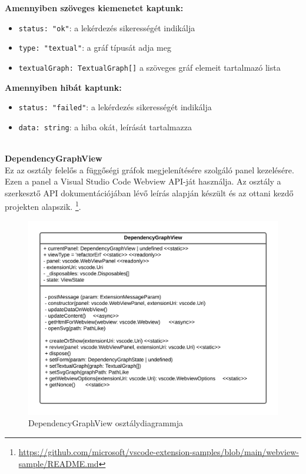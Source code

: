 \noindent \textbf{Amennyiben szöveges kiemenetet kaptunk:}
\begin{itemize}
    \item \lstinline{status: "ok"}: a lekérdezés sikerességét indikálja
    \item \lstinline{type: "textual"}: a gráf típusát adja meg
    \item \lstinline{textualGraph: TextualGraph[]} a szöveges gráf elemeit tartalmazó lista
\end{itemize}


\noindent \textbf{Amennyiben hibát kaptunk:}
\begin{itemize}
    \item \lstinline{status: "failed"}: a lekérdezés sikerességét indikálja
    \item \lstinline{data: string}: a hiba okát, leírását tartalmazza
\end{itemize}


\\
\vspace{14pt}
\textbf{DependencyGraphView}
\\

Ez az osztály felelős a függőségi gráfok megjelenítésére szolgáló panel kezelésére. Ezen a panel a Visual Studio Code Webview API-ját használja. Az osztály a szerkesztő API dokumentációjában lévő leírás alapján készült \cite{webViewGuide} és az ottani kezdő projekten alapszik. \footnote{\url{https://github.com/microsoft/vscode-extension-samples/blob/main/webview-sample/README.md}}. 


\begin{figure}[H]
  \centering
  \includegraphics[width=\linewidth]{images/diagramDepg.png}
  \caption{DependencyGraphView osztálydiagrammja}
  \label{fig:diagramDepg}
\end{figure}

